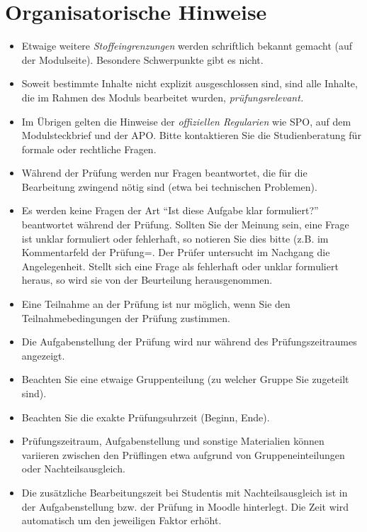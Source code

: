 \documentclass[
  a4paper,
  DIV=11]{scrreprt}
\providecommand{\tightlist}{%
  \setlength{\itemsep}{0pt}\setlength{\parskip}{0pt}}\usepackage{longtable,booktabs,array}
\theoremstyle{definition}
\theoremstyle{remark}
\begin{document}
\hypertarget{organisatorische-hinweise}{%
\section{Organisatorische Hinweise}\label{organisatorische-hinweise}}

\begin{itemize}
\tightlist
\item
  Etwaige weitere \emph{Stoffeingrenzungen} werden schriftlich bekannt
  gemacht (auf der Modulseite). Besondere Schwerpunkte gibt es nicht.
\item
  Soweit bestimmte Inhalte nicht explizit ausgeschlossen sind, sind alle
  Inhalte, die im Rahmen des Moduls bearbeitet wurden,
  \emph{prüfungsrelevant.}
\item
  Im Übrigen gelten die Hinweise der \emph{offiziellen Regularien} wie
  SPO, auf dem Modulsteckbrief und der APO. Bitte kontaktieren Sie die
  Studienberatung für formale oder rechtliche Fragen.
\item
  Während der Prüfung werden nur Fragen beantwortet, die für die
  Bearbeitung zwingend nötig sind (etwa bei technischen Problemen).
\item
  Es werden keine Fragen der Art ``Ist diese Aufgabe klar formuliert?''
  beantwortet während der Prüfung. Sollten Sie der Meinung sein, eine
  Frage ist unklar formuliert oder fehlerhaft, so notieren Sie dies
  bitte (z.B. im Kommentarfeld der Prüfung=. Der Prüfer untersucht im
  Nachgang die Angelegenheit. Stellt sich eine Frage als fehlerhaft oder
  unklar formuliert heraus, so wird sie von der Beurteilung
  herausgenommen.
\item
  Eine Teilnahme an der Prüfung ist nur möglich, wenn Sie den
  Teilnahmebedingungen der Prüfung zustimmen.
\item
  Die Aufgabenstellung der Prüfung wird nur während des
  Prüfungszeitraumes angezeigt.
\item
  Beachten Sie eine etwaige Gruppenteilung (zu welcher Gruppe Sie
  zugeteilt sind).
\item
  Beachten Sie die exakte Prüfungsuhrzeit (Beginn, Ende).
\item
  Prüfungszeitraum, Aufgabenstellung und sonstige Materialien können
  variieren zwischen den Prüflingen etwa aufgrund von
  Gruppeneinteilungen oder Nachteilsausgleich.
\item
  Die zusätzliche Bearbeitungszeit bei Studentis mit Nachteilsausgleich
  ist in der Aufgabenstellung bzw. der Prüfung in Moodle hinterlegt. Die
  Zeit wird automatisch um den jeweiligen Faktor erhöht.
\end{itemize}
\end{document}
